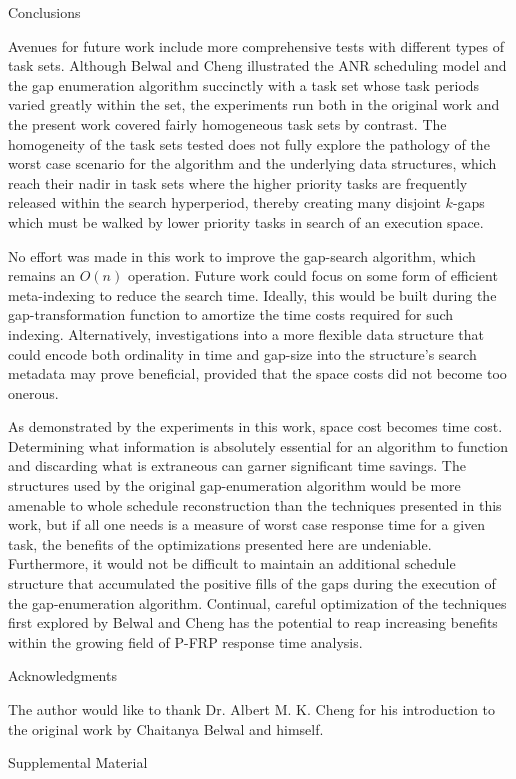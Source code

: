\documentclass{article}
\begin{document}
\begin{section}{Conclusions}
  \begin{paragraph}{}
    Avenues for future work include more comprehensive tests with different types of task
    sets. Although Belwal and Cheng illustrated the ANR scheduling model and the gap
    enumeration algorithm succinctly with a task set whose task periods varied greatly
    within the set, the experiments run both in the original work and the present work
    covered fairly homogeneous task sets by contrast. The homogeneity of the task sets
    tested does not fully explore the pathology of the worst case scenario for the
    algorithm and the underlying data structures, which reach their nadir in task sets
    where the higher priority tasks are frequently released within the search hyperperiod,
    thereby creating many disjoint $k$-gaps which must be walked by lower priority tasks
    in search of an execution space.
  \end{paragraph}
  \begin{paragraph}{}
    No effort was made in this work to improve the gap-search algorithm, which remains
    an $O(n)$ operation. Future work could focus on some form of efficient meta-indexing
    to reduce the search time. Ideally, this would be built during the gap-transformation
    function to amortize the time costs required for such indexing.
    Alternatively, investigations into a more flexible data structure that could encode
    both ordinality in time and gap-size into the structure's search metadata may prove
    beneficial, provided that the space costs did not become too onerous.
  \end{paragraph}
  \begin{paragraph}{}
    As demonstrated by the experiments in this work, space cost becomes time cost.
    Determining what information is absolutely essential for an algorithm to function
    and discarding what is extraneous can garner significant time savings.
    The structures used by the original gap-enumeration algorithm would be more amenable
    to whole schedule reconstruction than the techniques presented in this work, but if
    all one needs is a measure of worst case response time for a given task, the benefits
    of the optimizations presented here are undeniable. Furthermore, it would not be
    difficult to maintain an additional schedule structure that accumulated the positive
    fills of the gaps during the execution of the gap-enumeration algorithm.
    Continual, careful optimization of the techniques first explored by Belwal and Cheng
    has the potential to reap increasing benefits within the growing field of
    P-FRP response time analysis.
  \end{paragraph}
\end{section}

\begin{section}{Acknowledgments}
  \begin{paragraph}{}
    The author would like to thank Dr. Albert M. K. Cheng for his introduction to the original work by Chaitanya Belwal and himself.
  \end{paragraph}
\end{section}

\printbibliography

\begin{section}{Supplemental Material}
\end{section}
\end{document}
